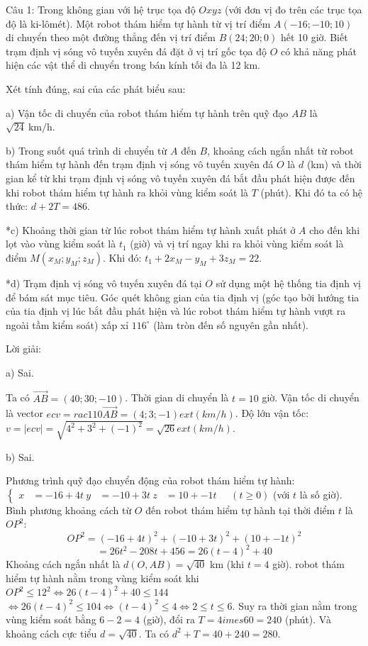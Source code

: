 \documentclass[a4paper,12pt]{article}
\newcommand{\heva}[1]{\left\{\begin{aligned}#1\end{aligned}\right.}
\begin{document}
Câu 1: Trong không gian với hệ trục tọa độ $Oxyz$ (với đơn vị đo trên các trục tọa độ là ki-lômét). Một robot thám hiểm tự hành từ vị trí điểm $A(-16; -10; 10)$ di chuyển theo một đường thẳng đến vị trí điểm $B(24; 20; 0)$ hết 10 giờ. Biết trạm định vị sóng vô tuyến xuyên đá đặt ở vị trí gốc tọa độ $O$ có khả năng phát hiện các vật thể di chuyển trong bán kính tối đa là 12 km.

Xét tính đúng, sai của các phát biểu sau:

a) Vận tốc di chuyển của robot thám hiểm tự hành trên quỹ đạo $AB$ là $\sqrt{24} \mathrm{~km/h}$.

b) Trong suốt quá trình di chuyển từ $A$ đến $B$, khoảng cách ngắn nhất từ robot thám hiểm tự hành đến trạm định vị sóng vô tuyến xuyên đá $O$ là $d$ (km) và thời gian kể từ khi trạm định vị sóng vô tuyến xuyên đá bắt đầu phát hiện được đến khi robot thám hiểm tự hành ra khỏi vùng kiểm soát là $T$ (phút). Khi đó ta có hệ thức: $d + 2T = 486$.

*c) Khoảng thời gian từ lúc robot thám hiểm tự hành xuất phát ở $A$ cho đến khi lọt vào vùng kiểm soát là $t_1$ (giờ) và vị trí ngay khi ra khỏi vùng kiểm soát là điểm $M(x_M; y_M; z_M)$. Khi đó: $t_1 + 2x_M - y_M + 3z_M = 22$.

*d) Trạm định vị sóng vô tuyến xuyên đá tại $O$ sử dụng một hệ thống tia định vị để bám sát mục tiêu. Góc quét không gian của tia định vị (góc tạo bởi hướng tia của tia định vị lúc bắt đầu phát hiện và lúc robot thám hiểm tự hành vượt ra ngoài tầm kiểm soát) xấp xỉ $116^{\circ}$ (làm tròn đến số nguyên gần nhất).

Lời giải:

a) Sai.

Ta có $\overrightarrow{AB} = (40; 30; -10) $. Thời gian di chuyển là $t = 10$ giờ.
Vận tốc di chuyển là vector $ec{v} = rac{1}{10} \overrightarrow{AB} = (4; 3; -1) 	ext{ (km/h)}$.
Độ lớn vận tốc: $v = |ec{v}| = \sqrt{4^2 + 3^2 + (-1)^2} = \sqrt{26} 	ext{ (km/h)}$.

b) Sai.

Phương trình quỹ đạo chuyển động của robot thám hiểm tự hành: $\heva{x &= -16 + 4t \ y &= -10 + 3t \ z &= 10 + -1t} \quad (t \ge 0)$ (với $t$ là số giờ).
Bình phương khoảng cách từ $O$ đến robot thám hiểm tự hành tại thời điểm $t$ là $OP^2$:
$$OP^2 = (-16 + 4t)^2 + (-10 + 3t)^2 + (10 + -1t)^2$$
$$= 26t^2 - 208t + 456 = 26(t - 4)^2 + 40$$
Khoảng cách ngắn nhất là $d(O, AB) = \sqrt{40}$ km (khi $t = 4$ giờ).
robot thám hiểm tự hành nằm trong vùng kiểm soát khi $OP^2 \le 12^2 \iff 26(t - 4)^2 + 40 \le 144$
$\iff 26(t - 4)^2 \le 104 \iff (t - 4)^2 \le 4 \iff 2 \le t \le 6$.
Suy ra thời gian nằm trong vùng kiểm soát bằng $6 - 2 = 4$ (giờ), đổi ra $T = 4 	imes 60 = 240$ (phút).
Và khoảng cách cực tiểu $d = \sqrt{40}$.
Ta có  $d^2 + T = 40 + 240 = 280$.
\end{document}
